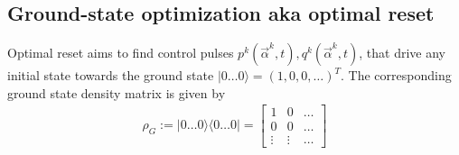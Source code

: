 \documentclass[11pt]{article}
\begin{document}
\subsection{Ground-state optimization aka optimal
reset}\label{sec:groundstate-obj}
Optimal reset aims to find control pulses $p^k(\vec{\alpha}^k, t), q^k(\vec{\alpha}^k, t)$,
that drive any initial state towards the ground state $|0\dots 0\rangle = (1, 0,
0, \dots )^T$. The corresponding ground state density matrix is given by
\begin{align}
  \rho_{G} := |0\dots 0\rangle \langle 0 \dots 0 | = 
  \begin{bmatrix} 1      & 0      &  \dots   \\ 
                  0      & 0      &  \dots  \\ 
                  \vdots & \vdots &  \dots 
  \end{bmatrix}
\end{align}
\end{document}
